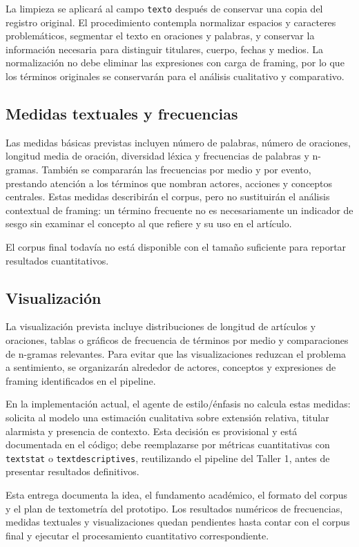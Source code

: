 \documentclass[10pt,twocolumn]{article}
\begin{document}
La limpieza se aplicará al campo \texttt{texto} después de conservar una copia del
registro original. El procedimiento contempla normalizar espacios y caracteres
problemáticos, segmentar el texto en oraciones y palabras, y conservar la
información necesaria para distinguir titulares, cuerpo, fechas y medios. La
normalización no debe eliminar las expresiones con carga de framing, por lo
que los términos originales se conservarán para el análisis cualitativo y
comparativo.

\subsection{Medidas textuales y frecuencias}

Las medidas básicas previstas incluyen número de palabras, número de
oraciones, longitud media de oración, diversidad léxica y frecuencias de
palabras y n-gramas. También se compararán las frecuencias por medio y por
evento, prestando atención a los términos que nombran actores, acciones y
conceptos centrales. Estas medidas describirán el corpus, pero no sustituirán
el análisis contextual de framing: un término frecuente no es necesariamente
un indicador de sesgo sin examinar el concepto al que refiere y su uso en el
artículo.

El corpus final todavía no está disponible con el tamaño suficiente para
reportar resultados cuantitativos. %

\subsection{Visualización}

La visualización prevista incluye distribuciones de longitud de artículos y
oraciones, tablas o gráficos de frecuencia de términos por medio y
comparaciones de n-gramas relevantes. Para evitar que las visualizaciones
reduzcan el problema a sentimiento, se organizarán alrededor de actores,
conceptos y expresiones de framing identificados en el pipeline. %

En la implementación actual, el agente de estilo/énfasis no calcula estas
medidas: solicita al modelo una estimación cualitativa sobre extensión
relativa, titular alarmista y presencia de contexto. Esta decisión es
provisional y está documentada en el código; debe reemplazarse por métricas
cuantitativas con \texttt{textstat} o \texttt{textdescriptives}, reutilizando el pipeline del
Taller 1, antes de presentar resultados definitivos.

Esta entrega documenta la idea, el fundamento académico, el formato del
corpus y el plan de textometría del prototipo. Los resultados numéricos de
frecuencias, medidas textuales y visualizaciones quedan pendientes hasta
contar con el corpus final y ejecutar el procesamiento cuantitativo
correspondiente. %



\end{document}

